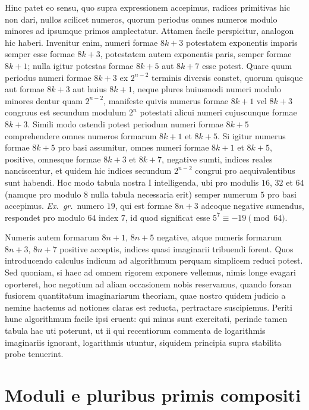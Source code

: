 \documentclass[12pt,a4paper]{article}
\theoremstyle{plain}
\theoremstyle{definition}
\theoremstyle{remark}
\begin{document}
Hinc patet eo sensu, quo supra expressionem accepimus, radices primitivas hic non dari, nullos scilicet numeros, quorum periodus omnes numeros modulo minores ad ipsumque primos amplectatur. Attamen facile perspicitur, analogon hic haberi. Invenitur enim, numeri formae $8k+3$ potestatem exponentis imparis semper esse formae $8k+3$, potestatem autem exponentis paris, semper formae $8k+1$; nulla igitur potestas formae $8k+5$ aut $8k+7$ esse potest. Quare quum periodus numeri formae $8k+3$ ex $2^{n-2}$ terminis diversis constet, quorum quisque aut formae $8k+3$ aut huius $8k+1$, neque plures huiusmodi numeri modulo minores dentur quam $2^{n-2}$, manifeste quivis numerus formae $8k+1$ vel $8k+3$ congruus est secundum modulum $2^n$ potestati alicui numeri cujuscunque formae $8k+3$. Simili modo ostendi potest periodum numeri formae $8k+5$ comprehendere omnes numeros formarum $8k+1$ et $8k+5$. Si igitur numerus formae $8k+5$ pro basi assumitur, omnes numeri formae $8k+1$ et $8k+5$, positive, omnesque formae $8k+3$ et $8k+7$, negative sumti, indices reales nanciscentur, et quidem hic indices secundum $2^{n-2}$ congrui pro aequivalentibus sunt habendi. Hoc modo tabula nostra I intelligenda, ubi pro modulis $16$, $32$ et $64$ (namque pro modulo $8$ nulla tabula necessaria erit) semper numerum $5$ pro basi accepimus. \textit{Ex.\ gr.}\ numero $19$, qui est formae $8n+3$ adeoque negative sumendus, respondet pro modulo $64$ index $7$, id quod significat esse $5^7 \equiv -19 \pmod{64}$.

Numeris autem formarum $8n+1$, $8n+5$ negative, atque numeris formarum $8n+3$, $8n+7$ positive acceptis, indices quasi imaginarii tribuendi forent. Quos introducendo calculus indicum ad algorithmum perquam simplicem reduci potest. Sed quoniam, si haec ad omnem rigorem exponere vellemus, nimis longe evagari oporteret, hoc negotium ad aliam occasionem nobis reservamus, quando forsan fusiorem quantitatum imaginariarum theoriam, quae nostro quidem judicio a nemine hactenus ad notiones claras est reducta, pertractare suscipiemus. Periti hunc algorithmum facile ipsi eruent: qui minus sunt exercitati, perinde tamen tabula hac uti poterunt, ut ii qui recentiorum commenta de logarithmis imaginariis ignorant, logarithmis utuntur, siquidem principia supra stabilita probe tenuerint.

\section*{Moduli e pluribus primis compositi}
\end{document}
